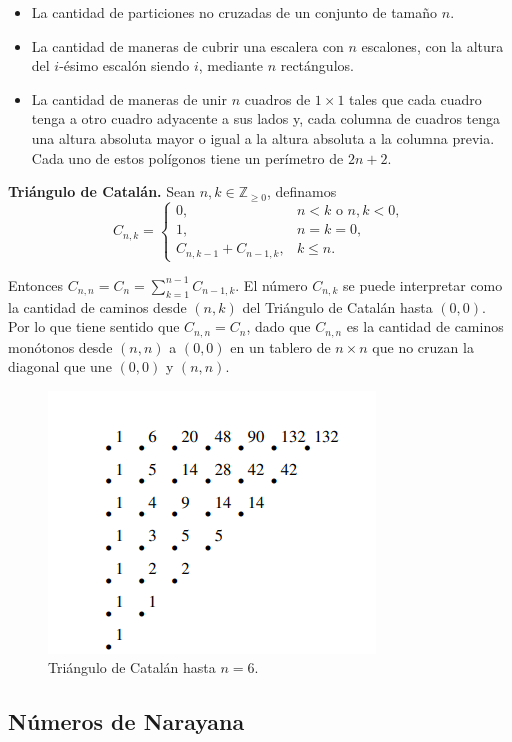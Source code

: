 \documentclass[10pt,spanish,mexico]{article}
\numberwithin{equation}{section}
\newcommand{\Z}{\mathbb{Z}}
\begin{document}
\begin{multicols}{2}
\begin{itemize}
    \item La cantidad de particiones no cruzadas de un conjunto de tamaño $n$.
    \item La cantidad de maneras de cubrir una escalera con $n$ escalones, con la altura del $i$-ésimo escalón siendo $i$, mediante $n$ rectángulos.
    \item La cantidad de maneras de unir $n$ cuadros de $1 \times 1$ tales que cada cuadro tenga a otro cuadro adyacente a sus lados y, cada columna de cuadros tenga una altura absoluta mayor o igual a la altura absoluta a la columna previa. Cada uno de estos polígonos tiene un perímetro de $2n + 2$.
\end{itemize}

\textbf{Triángulo de Catalán.} Sean $n, k \in \Z_{\geq 0}$, definamos
$$C_{n, k} = \begin{cases}
    0, &n < k \text{ o } n, k < 0,\\
    1, &n = k = 0,\\
    C_{n, k - 1} + C_{n - 1, k}, &k \leq n.
\end{cases}$$

Entonces $C_{n, n} = C_n = \sum_{k = 1}^{n - 1} C_{n - 1, k}$. El número $C_{n, k}$ se puede interpretar como la cantidad de caminos desde $(n, k)$ del Triángulo de Catalán hasta $(0, 0)$. Por lo que tiene sentido que $C_{n, n} = C_n$, dado que $C_{n, n}$ es la cantidad de caminos monótonos desde $(n, n)$ a $(0, 0)$ en un tablero de $n \times n$ que no cruzan la diagonal que une $(0, 0)$ y $(n, n)$.
\begin{figure}[H]
    \centering
    \includegraphics[width=0.5\linewidth]{img/triangulo_catalan.png}
    \caption{Triángulo de Catalán hasta $n = 6$.}
\end{figure}

\subsection{Números de Narayana}


\end{multicols}
\end{document}
